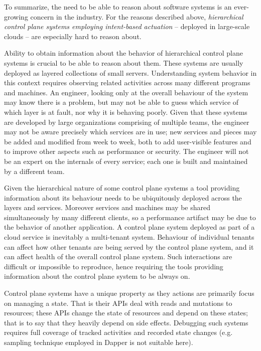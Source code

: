 To summarize, the need to be able to reason about software systems is an ever-growing concern in the industry. For the reasons described above, \textit{hierarchical control plane systems employing intent-based actuation} -- deployed in large-scale clouds -- are especially hard to reason about.


Ability to obtain information about the behavior of hierarchical control plane systems is crucial to be able to reason about them. These systems are usually deployed as layered collections of small servers. Understanding system behavior in this context requires observing related activities across many different programs and machines. An engineer, looking only at the overall behaviour of the system may know there is a problem, but may not be able to guess which service of which layer is at fault, nor why it is behaving poorly. Given that these systems are developed by large organizations comprising of multiple teams, the engineer may not be aware precisely which services are in use; new services and pieces may be added and modified from week to week, both to add user-visible features and to improve other aspects such as performance or security. The engineer will not be an expert on the internals of every service; each one is built and maintained by a different team.

Given the hierarchical nature of some control plane systems a tool providing information about its behaviour needs to be ubiquitously deployed across the layers and services. Moreover services and machines may be shared simultaneously by many different clients, so a performance artifact may be due to the behavior of another application. A control plane system deployed as part of a cloud service is inevitably a multi-tenant system. Behaviour of individual tenants can affect how other tenants are being served by the control plane system, and it can affect health of the overall control plane system. Such interactions are difficult or impossible to reproduce, hence requiring the tools providing information about the control plane system to be always on.

Control plane systems have a unique property as they actions are primarily focus on managing a state. That is their APIs deal with reads and mutations to resources; these APIs change the state of resources and depend on these states; that is to say that they heavily depend on side effects. Debugging such systems requires full coverage of tracked activities and recorded state changes (e.g. sampling technique employed in Dapper is not suitable here).

